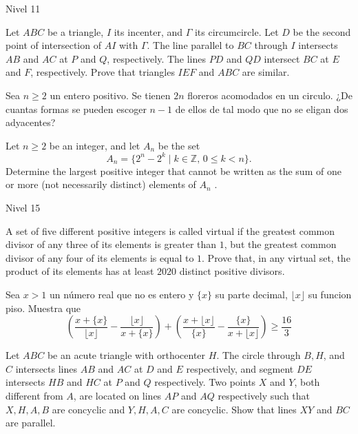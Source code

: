 \documentclass[12pt]{article}
\begin{document}
\begin{examen}{Nivel 11}{}
    \begin{problema}
 	Let $ABC$ be a triangle, $I$ its incenter, and $\Gamma$ its circumcircle. Let $D$ be the second point of intersection of $AI$ with $\Gamma$. The line parallel to $BC$ through $I$ intersects $AB$ and $AC$ at $P$ and $Q$, respectively. The lines $PD$ and $QD$ intersect $BC$ at $E$ and $F$, respectively. Prove that triangles $IEF$ and $ABC$ are similar.
    \end{problema}
    
    \begin{problema}
        Sea $n\geq 2$ un entero positivo. Se tienen $2n$ floreros acomodados en un circulo. ¿De cuantas formas se pueden escoger $n-1$ de ellos de tal modo que no se eligan dos adyacentes?
    \end{problema}

     \begin{problema}
  	Let $n \ge 2$ be an integer, and let $A_n$ be the set\[A_n = \{2^n  - 2^k\mid k \in \mathbb{Z},\, 0 \le k < n\}.\]Determine the largest positive integer that cannot be written as the sum of one or more (not necessarily distinct) elements of $A_n$ .
    \end{problema}
    
    
\end{examen}

\begin{examen}{Nivel 15}{}
    \begin{problema}
        	A set of five different positive integers is called virtual if the greatest common divisor of any three of its elements is greater than $1$, but the greatest common divisor of any four of its elements is equal to $1$. Prove that, in any virtual set, the product of its elements has at least $2020$ distinct positive divisors.
    \end{problema}    

    \begin{problema}
        Sea $x>1$ un número real que no es entero y $\{ x\}$ su parte decimal, $\lfloor x \rfloor$ su funcion piso. Muestra que 
        \[ \left( \frac{x+\{ x\}}{\lfloor x \rfloor}- \frac{\lfloor x \rfloor}{x+\{ x\}} \right) + \left( \frac{x+\lfloor x\rfloor}{\{ x \}}- \frac{\{ x \}}{x+\lfloor x\rfloor}\right) \geq \frac{16}{3} \]
    \end{problema}

    \begin{problema}
        Let $ABC$ be an acute triangle with orthocenter $H$. The circle through $B, H$, and $C$ intersects lines $AB$ and $AC$ at $D$ and $E$ respectively, and segment $DE$ intersects $HB$ and $HC$ at $P$ and $Q$ respectively. Two points $X$ and $Y$, both different from $A$, are located on lines $AP$ and $AQ$ respectively such that $X, H, A, B$ are concyclic and $Y, H, A, C$ are concyclic. Show that lines $XY$ and $BC$ are parallel.
    \end{problema}
\end{examen}
\end{document}
